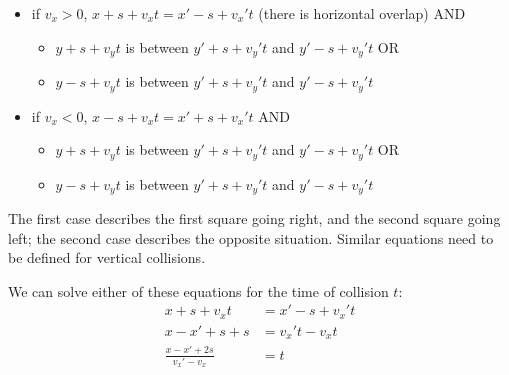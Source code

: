 \documentclass{article}
\begin{document}
\begin{itemize}
\item if $v_x > 0$, $x+s+v_xt = x'-s+v_x't$ (there is horizontal overlap) AND
\begin{itemize}
\item $y+s+v_yt$ is between $y'+s+v_y't$ and $y'-s+v_y't$ OR
\item $y-s+v_yt$ is between $y'+s+v_y't$ and $y'-s+v_y't$
\end{itemize}
\item if $v_x < 0$, $x-s+v_xt = x'+s+v_x't$ AND
\begin{itemize}
\item $y+s+v_yt$ is between $y'+s+v_y't$ and $y'-s+v_y't$ OR
\item $y-s+v_yt$ is between $y'+s+v_y't$ and $y'-s+v_y't$
\end{itemize}
\end{itemize}

The first case describes the first square going right, and the second square going left; the second case describes the opposite situation.  Similar equations need to be defined for vertical collisions.

We can solve either of these equations for the time of collision $t$:
\begin{align*}
x+s+v_xt &= x'-s+v_x't \\
x-x'+s+s &= v_x't -v_xt \\
\frac{x-x'+2s}{v_x'-v_x} &= t \\
\end{align*}
\end{document}
